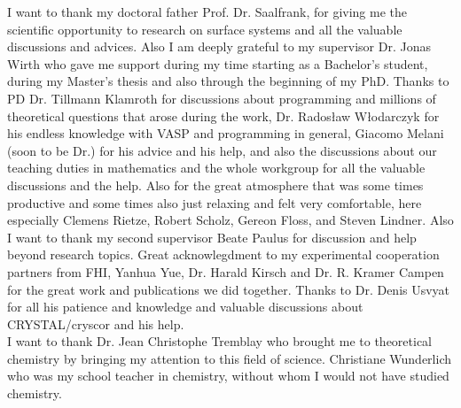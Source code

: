 \documentclass[11pt,DIV=13,BCOR=5mm,a4paper,headinclude]{scrbook}
\begin{document}
\begingroup
\renewcommand{\cleardoublepage}{}
\clearpage
{}
\endgroup
I want to thank my doctoral father Prof. Dr. Saalfrank, for giving me the scientific opportunity to research on surface systems and all the valuable discussions and advices.
Also I am deeply grateful to my supervisor Dr. Jonas Wirth who gave me support during my time starting as a Bachelor's student, during my Master's thesis and also through the beginning of my PhD.
Thanks to PD Dr. Tillmann Klamroth for discussions about programming and millions of theoretical questions that arose during the work, Dr. Rados\l{}aw W\l{}odarczyk for his endless knowledge with VASP and programming in general, Giacomo Melani (soon to be Dr.) for his advice and his help, and also the discussions about our teaching duties in mathematics and the whole workgroup for all the valuable discussions and the help.
Also for the great atmosphere that was some times productive and some times also just relaxing and felt very comfortable, here especially Clemens Rietze, Robert Scholz, Gereon Floss, and Steven Lindner.
Also I want to thank my second supervisor Beate Paulus for discussion and help beyond research topics.
Great acknowlegdment to my experimental cooperation partners from FHI, Yanhua Yue, Dr. Harald Kirsch and Dr. R.
Kramer Campen for the great work and publications we did together.
Thanks to Dr. Denis Usvyat for all his patience and knowledge and valuable discussions about CRYSTAL/cryscor and his help.\\
I want to thank Dr. Jean Christophe Tremblay who brought me to theoretical chemistry by bringing my attention to this field of science.
Christiane Wunderlich who was my school teacher in chemistry, without whom I would not have studied chemistry.

\end{document}
